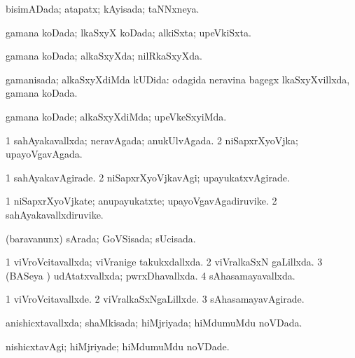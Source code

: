 {\bentry
{} 
\gl{\gu}
\bmng
bisimADada; atapatx; kAyisada; taNNxneya. 
\emng
\eentry

\bentry
{} 
\gl{\gu}
\bmng
gamana koDada; lkaSxyX koDada; alkiSxta; upeVkiSxta. 
\emng
\eentry

\bentry
{} 
\gl{\gu}
\expl{}
\bmng
gamana koDada; alkaSxyXda; nilRkaSxyXda. 
\emng
\eentry

\bentry
{} 
\gl{\gu}
\expl{}
\bmng
gamanisada; alkaSxyXdiMda kUDida:  odagida neravina bagegx lkaSxyXvillxda, gamana koDada. 
\emng
\eentry

\bentry
{} 
\gl{\kirxvi}
\expl{}
\bmng
gamana koDade; alkaSxyXdiMda; upeVkeSxyiMda. 
\emng
\eentry

\bentry
{} 
\gl{\gu}
\expl{}
\bmng
\bnum
\num{1} sahAyakavallxda; neravAgada; anukUlvAgada. 
\num{2} niSapxrXyoVjka; upayoVgavAgada. 
\enum
\emng
\eentry

\bentry
{} 
\gl{\kirxvi}
\expl{}
\bmng
\bnum
\num{1} sahAyakavAgirade. 
\num{2} niSapxrXyoVjkavAgi; upayukatxvAgirade. 
\enum
\emng
\eentry

\bentry
{} 
\gl{\nA}
\expl{}
\bmng
\bnum
\num{1} niSapxrXyoVjkate; anupayukatxte; upayoVgavAgadiruvike. 
\num{2} sahAyakavallxdiruvike. 
\enum
\emng
\eentry

\bentry
{} 
\gl{\gu}
\expl{}
\bmng
(baravanunx) sArada; GoVSisada; sUcisada. 
\emng
\eentry

\bentry
{} 
\gl{\gu}
\expl{}
\bmng
\bnum
\num{1} viVroVcitavallxda; viVranige takukxdallxda. 
\num{2} viVralkaSxN gaLillxda. 
\num{3} (BASeya \vi) udAtatxvallxda; pwrxDhavallxda. 
\num{4} sAhasamayavallxda. 
\enum
\emng
\eentry

\bentry
{} 
\gl{\kirxvi}
\expl{}
\bmng
\bnum
\num{1} viVroVcitavallxde. 
\num{2} viVralkaSxNgaLillxde. 
\num{3} sAhasamayavAgirade. 
\enum
\emng
\eentry

\bentry
{} 
\gl{\gu}
\expl{}
\bmng
anishicxtavallxda; shaMkisada; hiMjriyada; hiMdumuMdu noVDada. 
\emng
\eentry

\bentry
{} 
\gl{\kirxvi}
\expl{}
\bmng
nishicxtavAgi; hiMjriyade; hiMdumuMdu noVDade. 
\emng
\eentry

}
